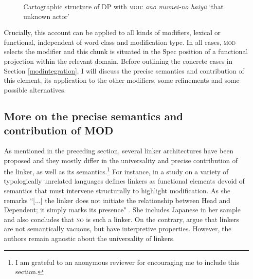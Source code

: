 \begin{figure}
\centering
{}
\caption{Cartographic structure of DP with \textsc{mod}: \textit{ano mumei-no haiyū} `that unknown actor’}
\label{Cartographic structure Mod}
\end{figure}

Crucially, this account can be applied to all kinds of modifiers, lexical or functional, independent of word class and modification type. In all cases, \textsc{mod} selects the modifier and this chunk is situated in the Spec position of a functional projection within the relevant domain. Before outlining the concrete cases in Section \ref{modintegration}, I will discuss the precise semantics and contribution of this element, its application to the other modifiers, some refinements and some possible alternatives.

\subsection{More on the precise semantics and contribution of MOD} \label{semantics mod}

As mentioned in the preceding section, several linker architectures have been proposed and they mostly differ in the universality and precise contribution of the linker, as well as its semantics.\footnote{I am grateful to an anonymous reviewer for encouraging me to include this section.} For instance, \citet{philip:2012:linkers} in a study on a variety of typologically unrelated languages defines linkers as functional elements devoid of semantics that must intervene structurally to highlight modification. As she remarks ``[...] the linker does not initiate the relationship between Head and Dependent; it simply marks its presence" \citep[65]{philip:2012:linkers}. She includes Japanese in her sample and also concludes that \textsc{no} is such a linker. On the contrary, \citet{franco:2015:linkers} argue that linkers are not semantically vacuous, but have interpretive properties. However, the authors remain agnostic about the universality of linkers.

